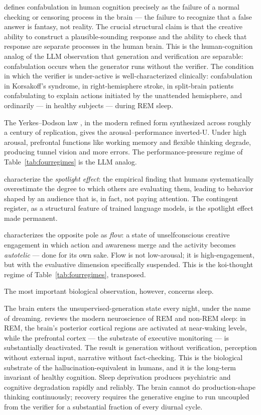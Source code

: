 \documentclass[11pt]{article}
\begin{document}
\cite{hirstein2005brain} defines confabulation in human cognition
precisely as the failure of a normal checking or censoring process in
the brain --- the failure to recognize that a false answer is fantasy,
not reality. The crucial structural claim is that the creative ability
to construct a plausible-sounding response and the ability to check
that response are separate processes in the human brain. This is the
human-cognition analog of the LLM observation that generation and
verification are separable: confabulation occurs when the generator
runs without the verifier. The condition in which the verifier is
under-active is well-characterized clinically: confabulation in
Korsakoff's syndrome, in right-hemisphere stroke, in split-brain
patients confabulating to explain actions initiated by the unattended
hemisphere, and ordinarily --- in healthy subjects --- during REM
sleep.

The Yerkes--Dodson law \cite{yerkes1908dancing}, in the modern refined
form synthesized across roughly a century of replication, gives the
arousal--performance inverted-U. Under high arousal, prefrontal
functions like working memory and flexible thinking degrade, producing
tunnel vision and more errors. The performance-pressure regime of
Table~\ref{tab:fourregimes} is the LLM analog.

\cite{gilovich2000spotlight} characterize the \emph{spotlight effect}:
the empirical finding that humans systematically overestimate the
degree to which others are evaluating them, leading to behavior shaped
by an audience that is, in fact, not paying attention. The contingent
register, as a structural feature of trained language models, is the
spotlight effect made permanent.

\cite{csikszentmihalyi1990flow} characterizes the opposite pole as
\emph{flow}: a state of unselfconscious creative engagement in which
action and awareness merge and the activity becomes \emph{autotelic}
--- done for its own sake. Flow is not low-arousal; it is
high-engagement, but with the evaluative dimension specifically
suspended. This is the koi-thought regime of
Table~\ref{tab:fourregimes}, transposed.

The most important biological observation, however, concerns sleep.

The brain enters the unsupervised-generation state every night, under
the name of dreaming. \cite{hobson2002dreaming} reviews the modern
neuroscience of REM and non-REM sleep: in REM, the brain's posterior
cortical regions are activated at near-waking levels, while the
prefrontal cortex --- the substrate of executive monitoring --- is
substantially deactivated. The result is generation without
verification, perception without external input, narrative without
fact-checking. This is the biological substrate of the
hallucination-equivalent in humans, and it is the long-term invariant
of healthy cognition. Sleep deprivation produces psychiatric and
cognitive degradation rapidly and reliably. The brain cannot do
production-shape thinking continuously; recovery requires the
generative engine to run uncoupled from the verifier for a substantial
fraction of every diurnal cycle.
\end{document}

